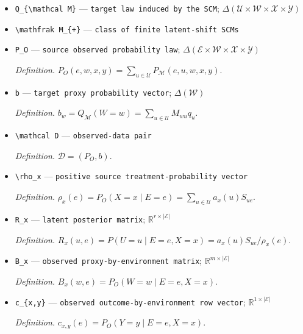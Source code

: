 \documentclass{article}
\begin{document}
\begin{itemize}
  \item \texttt{Q\_\allowbreak{}\{\textbackslash{}\allowbreak{}mathcal M\}\allowbreak{}} --- \texttt{target law induced by the SCM}; \(\Delta(\mathcal U\times\mathcal W\times\mathcal X\times\mathcal Y)\)
  \item \texttt{\textbackslash{}\allowbreak{}mathfrak M\_\allowbreak{}\{+\allowbreak{}\}\allowbreak{}} --- \texttt{class of finite latent-\allowbreak{}shift SCMs}
  \item \texttt{P\_\allowbreak{}O} --- \texttt{source observed probability law}; \(\Delta(\mathcal E\times\mathcal W\times\mathcal X\times\mathcal Y)\)
  \par\smallskip\noindent\emph{Definition.} \(P_O(e,w,x,y)=\sum_{u\in\mathcal U}P_{\mathcal M}(e,u,w,x,y)\).
  \item \texttt{b} --- \texttt{target proxy probability vector}; \(\Delta(\mathcal W)\)
  \par\smallskip\noindent\emph{Definition.} \(b_w=Q_{\mathcal M}(W=w)=\sum_{u\in\mathcal U}M_{wu}q_u\).
  \item \texttt{\textbackslash{}\allowbreak{}mathcal D} --- \texttt{observed-\allowbreak{}data pair}
  \par\smallskip\noindent\emph{Definition.} \(\mathcal D=(P_O,b)\).
  \item \texttt{\textbackslash{}\allowbreak{}rho\_\allowbreak{}x} --- \texttt{positive source treatment-\allowbreak{}probability vector}
  \par\smallskip\noindent\emph{Definition.} \(\rho_x(e)=P_O(X=x\mid E=e)=\sum_{u\in\mathcal U}a_x(u)S_{ue}\).
  \item \texttt{R\_\allowbreak{}x} --- \texttt{latent posterior matrix}; \(\mathbb R^{r\times\lvert\mathcal E\rvert}\)
  \par\smallskip\noindent\emph{Definition.} \(R_x(u,e)=P(U=u\mid E=e,X=x)=a_x(u)S_{ue}/\rho_x(e)\).
  \item \texttt{B\_\allowbreak{}x} --- \texttt{observed proxy-\allowbreak{}by-\allowbreak{}environment matrix}; \(\mathbb R^{m\times\lvert\mathcal E\rvert}\)
  \par\smallskip\noindent\emph{Definition.} \(B_x(w,e)=P_O(W=w\mid E=e,X=x)\).
  \item \texttt{c\_\allowbreak{}\{x,\allowbreak{}y\}\allowbreak{}} --- \texttt{observed outcome-\allowbreak{}by-\allowbreak{}environment row vector}; \(\mathbb R^{1\times\lvert\mathcal E\rvert}\)
  \par\smallskip\noindent\emph{Definition.} \(c_{x,y}(e)=P_O(Y=y\mid E=e,X=x)\).

\end{itemize}
\end{document}
